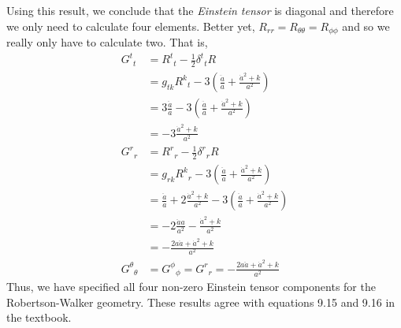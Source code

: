 \documentclass[a4paper, 11pt]{article}
\newenvironment{solution}{%
	\begin{list}{}{%
			\setlength{\topsep}{0pt}%
			\setlength{\leftmargin}{0.5cm}%
			\setlength{\rightmargin}{0.5cm}%
			\setlength{\listparindent}{\parindent}%
			\setlength{\itemindent}{\parindent}%
			\setlength{\parsep}{\parskip}%
		}%
		\item[]}{\end{list}}
\begin{document}
\begin{enumerate}[leftmargin=0em, label=\textbf{\arabic*}.]
\begin{solution}
      Using this result, we conclude that the \textit{Einstein tensor} is
      diagonal and therefore we only need to calculate four elements. Better
      yet, $R_{rr}=R_{\theta\theta}=R_{\phi\phi}$ and so we really only have to
      calculate two. That is,
      \begin{align}
        G^t{}_t &=  R^t{}_t-\frac{1}{2}\delta^t{}_tR \\
                &= g_{tk}R^k{}_t -3\left( \frac{\ddot{a}}{a}+\frac{\dot{a}^2+k}{a^2} \right) \\
                &= 3\frac{\ddot{a}}{a}-3\left( \frac{\ddot{a}}{a}+\frac{\dot{a}^2+k}{a^2} \right) \\
                &= -3\frac{\dot{a}^2+k}{a^2}\\
        G^r{}_r  &= R^r{}_r-\frac{1}{2}\delta^r{}_rR\\
                &= g_{rk}R^k{}_{r}-3\left( \frac{\ddot{a}}{a}+\frac{\dot{a}^2+k}{a^2} \right) \\
                &= \frac{\ddot{a}}{a}+2\frac{\dot{a}^2+k}{a^2}-3\left( \frac{\ddot{a}}{a}+\frac{\dot{a}^2+k}{a^2} \right) \\
                &= -2\frac{\ddot{a}a}{a^2}-\frac{\dot{a}^2+k}{a^2} \\
                &= -\frac{2a\ddot{a}+\dot{a}^2+k}{a^2}\\
        G^\theta{}_\theta &= G^\phi{}_\phi = G^r{}_r =  -\frac{2a\ddot{a}+\dot{a}^2+k}{a^2}
      \end{align}
      Thus, we have specified all four non-zero Einstein tensor components for
      the Robertson-Walker geometry. These results agree with equations 9.15 and
      9.16 in the textbook.
    \end{solution}
    


 \end{enumerate}

 
\end{document}
